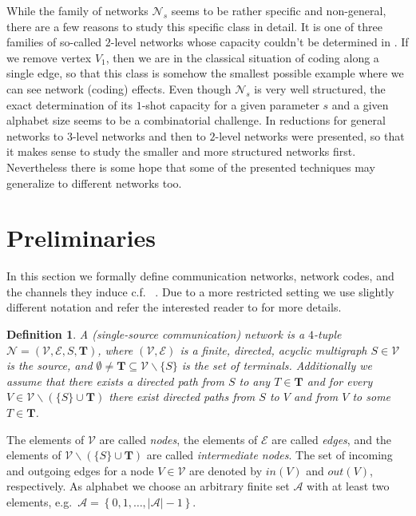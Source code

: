 \documentclass[11pt]{article}
\newcommand{\cA}{\mathcal{A}}
\newcommand{\cE}{\mathcal{E}}
\newcommand{\cN}{\mathcal{N}}
\newcommand{\cV}{\mathcal{V}}
\newtheorem{definition}[theorem]{Definition}
\begin{document}
While the family of networks $\cN_s$ seems to be rather specific and non-general, there are a few reasons to 
study this specific class in detail. It is one of three families of so-called $2$-level networks whose 
capacity couldn't be determined in \cite{beemer2022network_arxiv}. If we remove vertex $V_1$, then we are in 
the classical situation of coding along a single edge, so that this class is somehow the smallest possible 
example where we can see network (coding) effects. Even though $\cN_s$ is very well structured, the exact determination 
of its $1$-shot capacity for a given parameter $s$ and a given alphabet size seems to be a combinatorial 
challenge. In \cite{beemer2022network_arxiv} reductions for general networks to $3$-level networks and then 
to $2$-level networks were presented, so that it makes sense to study the smaller and more structured 
networks first. Nevertheless there is some hope that some of the presented techniques may generalize to 
different networks too.

\section{Preliminaries}
\label{sec_preliminaries}
In this section we formally define communication networks, network codes, and the channels they induce c.f.~ \cite{beemer2022network_arxiv,ravagnani2018adversarial}. 
Due to a more restricted setting we use slightly different notation and refer the interested reader to \cite{ravagnani2018adversarial} for more details.  

\begin{definition}
  A \emph{(single-source communication) network} is a $4$-tuple $\cN=(\cV,\cE,S,\mathbf{T})$, where $(\cV,\cE)$ is 
  a finite, directed, acyclic multigraph $S\in\cV$ is the \emph{source}, and $\emptyset\neq \mathbf{T}\subseteq
  \cV\backslash\{S\}$ is the set of \emph{terminals}. Additionally we assume that there exists a directed path 
  from $S$ to any $T\in\mathbf{T}$ and for every $V\in\cV\backslash(\{S\}\cup\mathbf{T})$ there exist 
  directed paths from $S$ to $V$ and from $V$ to some $T\in\mathbf{T}$.    
\end{definition}

The elements of $\cV$ are called \emph{nodes}, the elements of $\cE$ are called \emph{edges}, and the 
elements of $\cV\backslash(\{S\}\cup\mathbf{T})$ are called \emph{intermediate nodes}. The set of incoming 
and outgoing edges for a node $V\in\cV$ are denoted by $in(V)$ and $out(V)$, respectively. 
As alphabet we choose an arbitrary finite set $\cA$ with at least two elements, e.g.\ $\cA=\left\{0,1,\dots,|\cA|-1\right\}$.
\end{document}
